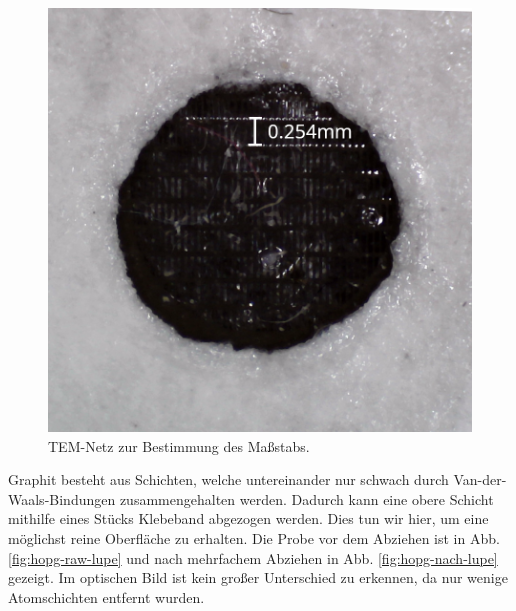 \documentclass{article}
\begin{document}
\begin{figure}[h]
\begin{minipage}{0.49\textwidth}
        \includegraphics[width=\textwidth]{GitterHOPG}
        \caption{TEM-Netz zur Bestimmung des Maßstabs.}
        \label{fig:gitter-hopg}
    \end{minipage}
\end{figure}

Graphit besteht aus Schichten, welche untereinander nur schwach durch Van-der-Waals-Bindungen
zusammengehalten werden. Dadurch kann eine obere Schicht mithilfe eines Stücks Klebeband abgezogen werden.
Dies tun wir hier, um eine möglichst reine Oberfläche zu erhalten. Die Probe vor dem
Abziehen ist in Abb. \ref{fig:hopg-raw-lupe} und nach mehrfachem Abziehen in Abb. \ref{fig:hopg-nach-lupe}
gezeigt. Im optischen Bild ist kein großer Unterschied zu erkennen, da nur wenige Atomschichten entfernt wurden.
\end{document}
